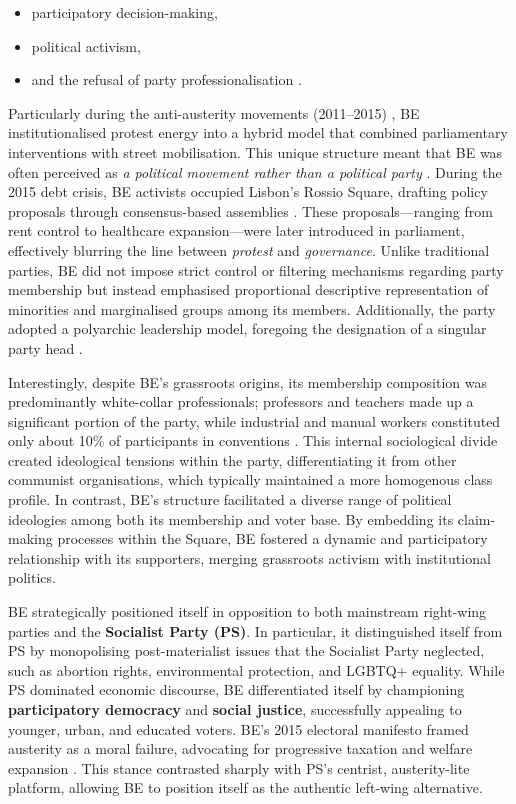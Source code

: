 \begin{itemize}
	\item participatory decision-making,
	\item political activism,
	\item and the refusal of party professionalisation \parencite[132]{lisi2009}.
\end{itemize}

Particularly during the anti-austerity movements (2011–2015) \parencite{principe2017}, BE institutionalised protest energy into a hybrid model that combined parliamentary interventions with street mobilisation. This unique structure meant that BE was often perceived as \emph{a political movement rather than a political party} \parencite[133]{lisi2009}. During the 2015 debt crisis, BE activists occupied Lisbon’s Rossio Square, drafting policy proposals through consensus-based assemblies \parencite{onlinesocialistmagazine2011}. These proposals—ranging from rent control to healthcare expansion—were later introduced in parliament, effectively blurring the line between \textit{protest} and \textit{governance}. Unlike traditional parties, BE did not impose strict control or filtering mechanisms regarding party membership but instead emphasised proportional descriptive representation of minorities and marginalised groups among its members. Additionally, the party adopted a polyarchic leadership model, foregoing the designation of a singular party head \parencite[133]{lisi2009}.

Interestingly, despite BE’s grassroots origins, its membership composition was predominantly white-collar professionals; professors and teachers made up a significant portion of the party, while industrial and manual workers constituted only about 10\% of participants in conventions \parencite[133]{lisi2009}. This internal sociological divide created ideological tensions within the party, differentiating it from other communist organisations, which typically maintained a more homogenous class profile. In contrast, BE’s structure facilitated a diverse range of political ideologies among both its membership and voter base. By embedding its claim-making processes within the Square, BE fostered a dynamic and participatory relationship with its supporters, merging grassroots activism with institutional politics.

BE strategically positioned itself in opposition to both mainstream right-wing parties and the \textbf{Socialist Party (PS)}. In particular, it distinguished itself from PS by monopolising post-materialist issues that the Socialist Party neglected, such as abortion rights, environmental protection, and LGBTQ+ equality. While PS dominated economic discourse, BE differentiated itself by championing \textbf{participatory democracy} and \textbf{social justice}, successfully appealing to younger, urban, and educated voters. BE’s 2015 electoral manifesto framed austerity as a moral failure, advocating for progressive taxation and welfare expansion \parencite[3]{lisi2016}. This stance contrasted sharply with PS’s centrist, austerity-lite platform, allowing BE to position itself as the authentic left-wing alternative.

